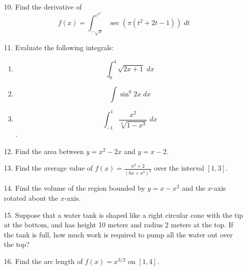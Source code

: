 \documentclass[11pt,reqno]{article}
\theoremstyle{definition}
\begin{document}
\begin{itemize}
		\item[10.] Find the derivative of $$f(x) = \int_{-\sqrt{x}}^{e^{x^2 }} \sec(\pi(t^2 + 2t - 1)) \; dt$$
		\item[11.] Evaluate the following integrals: 
		\begin{enumerate}
			\item $$\int_{0}^{4} \sqrt{2x + 1} \; dx$$
			\item $$\int \sin^6 2x \; dx$$ 
			\item $$\int_{-1}^{1} \frac{x^2}{\sqrt[3]{1 - x^3}} \; dx$$. 
		\end{enumerate}
		\item[12.] Find the area between $y = x^2 - 2x$ and $y = x - 2$. 
		\item[13.] Find the average value of $f(x) = \frac{x^2 + 2}{(6x + x^3)^2}$ over the interval $[1, 3]$. 
		\item[14.] Find the volume of the region bounded by $y = x - x^2$ and the $x$-axis rotated about the $x$-axis.
		\item[15.] Suppose that a water tank is shaped like a right circular cone with the tip at the bottom, and has height 10 meters and radius 2 meters at the top. If the tank is full, how much work is required to pump all the water out over the top? 
		\item[16.] Find the arc length of $f(x) = x^{3/2}$ on $[1,4]$. 
		
	\end{itemize}

	
	
\end{document}
